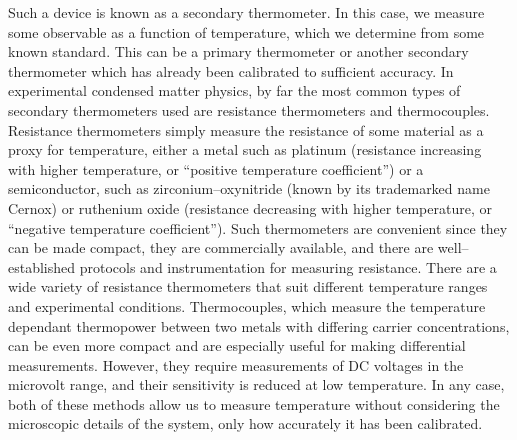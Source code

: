 \documentclass{thesis-umich}
\begin{document}
Such a device is known as a secondary thermometer. In this case, we
measure some observable as a function of temperature, which we determine
from some known standard. This can be a primary thermometer or another
secondary thermometer which has already been calibrated to sufficient
accuracy. In experimental condensed matter physics, by far the most
common types of secondary thermometers used are resistance thermometers
and thermocouples. Resistance thermometers simply measure the resistance
of some material as a proxy for temperature, either a metal such as
platinum (resistance increasing with higher temperature, or ``positive
temperature coefficient'') or a semiconductor, such as
zirconium--oxynitride (known by its trademarked name Cernox) or
ruthenium oxide (resistance decreasing with higher temperature, or
``negative temperature coefficient''). Such thermometers are convenient
since they can be made compact, they are commercially available, and
there are well--established protocols and instrumentation for measuring
resistance. There are a wide variety of resistance thermometers that
suit different temperature ranges and experimental conditions.
Thermocouples, which measure the temperature dependant thermopower
between two metals with differing carrier concentrations, can be even
more compact and are especially useful for making differential
measurements. However, they require measurements of DC voltages in the
microvolt range, and their sensitivity is reduced at low temperature. In
any case, both of these methods allow us to measure temperature without
considering the microscopic details of the system, only how accurately
it has been calibrated.
\end{document}
